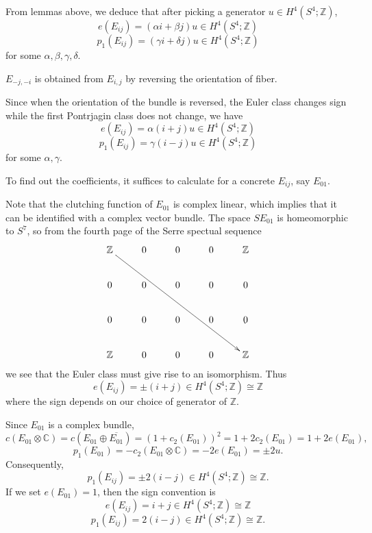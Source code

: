 \documentclass[twoside]{article}
\begin{document}
From lemmas above, 
we deduce that after picking a generator $u\in H^4(S^4;\mathbb{Z})$, 
\[
e(E_{ij}) = (\alpha i + \beta j)u  \in   H^4(S^4;\mathbb{Z})
\]
\[
p_1(E_{ij}) = (\gamma i + \delta j)u  \in   H^4(S^4;\mathbb{Z})
\]
for some $\alpha, \beta, \gamma, \delta$. 

\begin{lem}
	$E_{-j,-i}$ is obtained from $E_{i,j}$ by reversing the orientation of fiber. 
\end{lem}

Since when the orientation of the bundle is reversed, the Euler class changes sign while the first Pontrjagin class does not change, we have
\[
e(E_{ij}) = \alpha (i +  j)u  \in   H^4(S^4;\mathbb{Z})
\]
\[
p_1(E_{ij}) = \gamma (i- j)u  \in   H^4(S^4;\mathbb{Z})
\]
for some $\alpha, \gamma$. 

To find out the coefficients, it suffices to calculate for a concrete $E_{ij}$, say $E_{01}$. 

Note that the clutching function of $E_{01}$ is complex linear, which implies that it can be identified with a complex vector bundle. The space $SE_{01}$ is homeomorphic to $S^7$, so from the fourth page of the Serre spectual sequence
\[
\xymatrix{
	\mathbb{Z}\ar[rrrrddd]&0&0&0&\mathbb{Z}\\
	0&0&0&0&0\\
	0&0&0&0&0\\
	\mathbb{Z}&0&0&0&\mathbb{Z}
}
\]
we see that the Euler class must give rise to an isomorphism. Thus 
\[
e(E_{ij}) = \pm(i +  j) \in   H^4(S^4;\mathbb{Z}) \cong \mathbb{Z}
\]
where the sign depends on our choice of generator of $\mathbb{Z}$. 

Since $E_{01}$ is a complex bundle, 
\[
c(E_{01} \otimes \mathbb{C}) = c(E_{01} \oplus  \overline{E_{01}}) = (1 + c_2(E_{01}))^2 = 1 + 2c_2(E_{01}) = 1 + 2e(E_{01}), 
\]
\[
p_1(E_{01}) = -c_2(E_{01} \otimes \mathbb{C}) = -2e(E_{01}) = \pm 2 u. 
\]
Consequently, 
\[
p_1(E_{ij}) = \pm 2(i- j)  \in   H^4(S^4;\mathbb{Z}) \cong \mathbb{Z}. 
\]
If we set $e(E_{01}) = 1$, then the sign convention is 
\[
e(E_{ij}) = i +  j\in H^4(S^4;\mathbb{Z}) \cong \mathbb{Z}
\]
\[
p_1(E_{ij}) = 2(i- j)  \in   H^4(S^4;\mathbb{Z}) \cong \mathbb{Z}. 
\]
\end{document}
